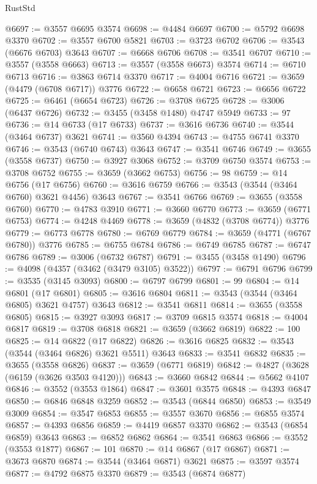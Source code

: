\begin{lexlean}{RustStd}
\begin{coremodule}
@6697 := @3557 @6695 @3574
@6698 := @4484 @6697
@6700 := @5792 @6698 @3370
@6702 := @3557 @6700 @5821
@6703 := @3723 @6702
@6706 := @3543 (@6676 @6703) @3643
@6707 := @6668 @6706
@6708 := @3541 @6707
@6710 := @3557 (@3558 @6663)
@6713 := @3557 (@3558 @6673) @3574
@6714 := @6710 @6713
@6716 := @3863 @6714 @3370
@6717 := @4004 @6716
@6721 := @3659 (@4479 (@6708 @6717)) @3776
@6722 := @6658 @6721
@6723 := @6656 @6722
@6725 := @6461 (@6654 @6723)
@6726 := @3708 @6725
@6728 := @3006 (@6437 @6726)
@6732 := @3455 (@3458 @1480) @4747 @5949
@6733 := 97
@6736 := @14 @6733 (@17 @6733)
@6737 := @3616 @6736
@6740 := @3544 (@3464 @6737) @3621
@6741 := @3560 @4394
@6743 := @4755 @6741 @3370
@6746 := @3543 (@6740 @6743) @3643
@6747 := @3541 @6746
@6749 := @3655 (@3558 @6737)
@6750 := @3927 @3068
@6752 := @3709 @6750 @3574
@6753 := @3708 @6752
@6755 := @3659 (@3662 @6753)
@6756 := 98
@6759 := @14 @6756 (@17 @6756)
@6760 := @3616 @6759
@6766 := @3543 (@3544 (@3464 @6760) @3621 @4456) @3643
@6767 := @3541 @6766
@6769 := @3655 (@3558 @6760)
@6770 := @4783 @3910
@6771 := @3660 @6770
@6773 := @3659 (@6771 @6753)
@6774 := @4248 @4469
@6778 := @3659 (@4832 (@3708 @6774)) @3776
@6779 := @6773 @6778
@6780 := @6769 @6779
@6784 := @3659 (@4771 (@6767 @6780)) @3776
@6785 := @6755 @6784
@6786 := @6749 @6785
@6787 := @6747 @6786
@6789 := @3006 (@6732 @6787)
@6791 := @3455 (@3458 @1490)
@6796 := @4098 (@4357 (@3462 (@3479 @3105) @3522))
@6797 := @6791 @6796
@6799 := @3535 (@3145 @3093)
@6800 := @6797 @6799
@6801 := 99
@6804 := @14 @6801 (@17 @6801)
@6805 := @3616 @6804
@6811 := @3543 (@3544 (@3464 @6805) @3621 @4757) @3643
@6812 := @3541 @6811
@6814 := @3655 (@3558 @6805)
@6815 := @3927 @3093
@6817 := @3709 @6815 @3574
@6818 := @4004 @6817
@6819 := @3708 @6818
@6821 := @3659 (@3662 @6819)
@6822 := 100
@6825 := @14 @6822 (@17 @6822)
@6826 := @3616 @6825
@6832 := @3543 (@3544 (@3464 @6826) @3621 @5511) @3643
@6833 := @3541 @6832
@6835 := @3655 (@3558 @6826)
@6837 := @3659 (@6771 @6819)
@6842 := @4827 (@3628 (@6159 (@3626 @3503 @4120)))
@6843 := @3660 @6842
@6844 := @5662 @4107
@6846 := @3552 (@3553 @1864)
@6847 := @3601 @3575
@6848 := @4393 @6847
@6850 := @6846 @6848 @3259
@6852 := @3543 (@6844 @6850)
@6853 := @3549 @3009
@6854 := @3547 @6853
@6855 := @3557 @3670
@6856 := @6855 @3574
@6857 := @4393 @6856
@6859 := @4419 @6857 @3370
@6862 := @3543 (@6854 @6859) @3643
@6863 := @6852 @6862
@6864 := @3541 @6863
@6866 := @3552 (@3553 @1877)
@6867 := 101
@6870 := @14 @6867 (@17 @6867)
@6871 := @3673 @6870
@6874 := @3544 (@3464 @6871) @3621
@6875 := @3597 @3574
@6877 := @4792 @6875 @3370
@6879 := @3543 (@6874 @6877)

\end{coremodule}
\end{lexlean}
